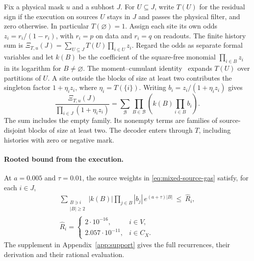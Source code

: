 \documentclass[10pt,twocolumn]{article}
\theoremstyle{definition}
\begin{document}
Fix a physical mask $u$ and a subhost $J$. For $U\subseteq J$, write
$T(U)$ for the residual sign if the execution on sources $U$ stays in
$J$ and passes the physical filter, and zero otherwise. In particular
$T(\varnothing)=1$. Assign each site its own odds $z_i=r_i/(1-r_i)$,
with $r_i=p$ on data and $r_i=q$ on readouts. The finite history
sum is $\Xi_{T,u}(J)=\sum_{U\subseteq J}T(U)\prod_{i\in U}z_i$.
Regard the odds as separate formal variables and let $k(B)$ be the
coefficient of the square-free monomial $\prod_{i\in B}z_i$ in its
logarithm for $B\ne\varnothing$. The moment--cumulant
identity~\cite{Speed83} expands $T(U)$ over partitions of $U$.
A site outside the blocks of size at least two contributes the
singleton factor $1+\eta_i z_i$, where $\eta_i=T(\{i\})$.
Writing $b_i=z_i/(1+\eta_i z_i)$ gives
\begin{equation}\label{eq:mixed-source-gas}
 \frac{\Xi_{T,u}(J)}{\prod_{i\in J}(1+\eta_i z_i)}
 =\sum_{\mathcal B}\prod_{B\in\mathcal B}
       \left(k(B)\prod_{i\in B}b_i\right).
\end{equation}
The sum includes the empty family. Its nonempty terms are families
of source-disjoint blocks of size at least two. The decoder enters
through $T$, including histories with zero or negative mark.

\paragraph{Rooted bound from the execution.}
At $a=0.005$ and $\tau=0.01$, the source weights in
\eqref{eq:mixed-source-gas} satisfy, for each $i\in J$,
\begin{equation}\label{eq:mixed-source-row}
 \begin{gathered}
 \sum_{\substack{B\ni i\\ |B|\ge2}}
 |k(B)|\prod_{j\in B}|b_j|\,e^{(a+\tau)|B|}
 \ \le\ \widehat R_i,\\
 \widehat R_i=
 \begin{cases}
 2\cdot10^{-16},& i\in V,\\
 2.057\cdot10^{-11},& i\in C_X.
 \end{cases}
 \end{gathered}
\end{equation}
The supplement in Appendix~\ref{app:support} gives the full recurrences,
their derivation and their rational evaluation.
\end{document}

